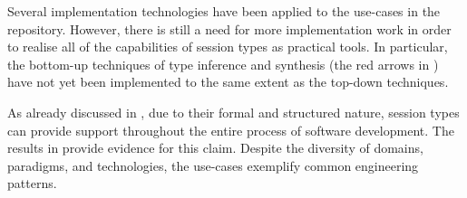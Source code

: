 
Several implementation technologies have been applied to the use-cases in the repository. However, there is still a need for more implementation work in order to realise all of the capabilities of session types as practical tools. In particular, the bottom-up techniques of type inference and synthesis (the red arrows in ) have not yet been implemented to the same extent as the top-down techniques.



%	
%	



As already discussed in ,
due to their formal and structured nature,
session types can provide support throughout the
entire process of software development.
The results in  provide evidence for this claim.
%
Despite the diversity of domains, paradigms,
and technologies, the use-cases exemplify common engineering patterns.


